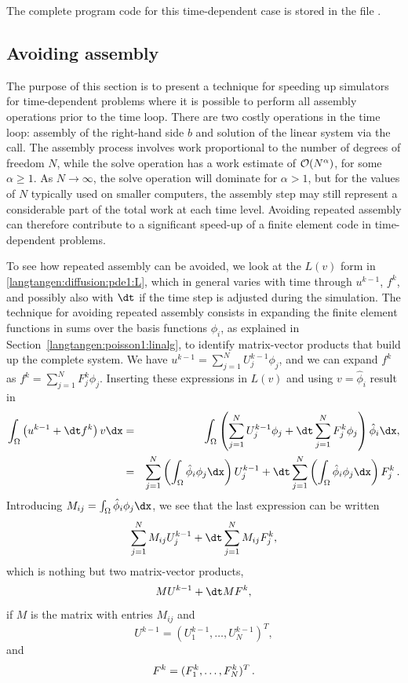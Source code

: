 The complete program code for this time-dependent case is stored in
the file .

\subsection{Avoiding assembly}
\label{langtangen:timedep:diffusion1:noassemble}

The purpose of this section is to present a technique for speeding
up \fenics{} simulators for time-dependent problems where it is
possible to perform all assembly operations prior to the time loop.
There are two costly operations in the time loop: assembly of the
right-hand side $b$ and solution of the linear system via the
 call. The assembly process involves work proportional to
the number of degrees of freedom $N$, while the solve operation
has a work estimate of ${\cal O}( N^{\alpha})$, for some $\alpha\geqslant 1$. As
$N\rightarrow\infty$, the solve operation will dominate for $\alpha>1$,
but for the values of $N$ typically used on smaller computers, the
assembly step may still
represent a considerable part of the total work at each
time level. Avoiding repeated assembly can therefore contribute to a
significant speed-up of a finite element code in time-dependent problems.

To see how repeated assembly can be avoided, we look at the $L(v)$
form in \eqref{langtangen:diffusion:pde1:L}, which in general varies with
time through $u^{k-1}$, $f^k$, and possibly also with ${\dt}$
if the time step is adjusted during the simulation.
The technique for avoiding repeated assembly consists in
expanding the finite element functions in sums over the basis functions
$\phi_i$, as explained
in Section~\ref{langtangen:poisson1:linalg}, to identify matrix-vector
products that build up the complete system. We have
$u^{k-1}=\sum_{j=1}^NU^{k-1}_j\phi_j$, and we can expand $f^k$ as
$f^{k}=\sum_{j=1}^NF^{k}_j\phi_j$. Inserting these expressions in $L(v)$
and using
$v=\hat\phi_i$ result in
\begin{eqnarray}
\int_\Omega \left(u^{k-1} + {\dt}f^k\right)v\dx &=&
\int_\Omega \left(\sum_{j=1}^N U^{k-1}_j\phi_j + {\dt}\sum_{j=1}^N F^{k}_j\phi_j\right)\hat\phi_i\dx,\\
&=&\sum_{j=1}^N\left(\int_\Omega \hat\phi_i\phi_j\dx\right)U^{k-1}_j
 + {\dt}\sum_{j=1}^N\left(\int_\Omega \hat\phi_i\phi_j\dx\right)F^{k}_j\langtangenep
\end{eqnarray}
Introducing $M_{ij} = \int_\Omega \hat\phi_i\phi_j\dx$, we see that
the last expression can be written
\[ \sum_{j=1}^NM_{ij}U^{k-1}_j + {\dt} \sum_{j=1}^NM_{ij}F^{k}_j,\]
which is nothing but two matrix-vector products,
\[ MU^{k-1} + {\dt} MF^k,\]
if $M$ is the matrix with entries $M_{ij}$ and
\[U^{k-1}=(U^{k-1}_1,\ldots,U^{k-1}_N)^T,\]
and
\[ F^k=(F^{k}_1,\ldots,F^{k}_N)^T\thinspace .\]

